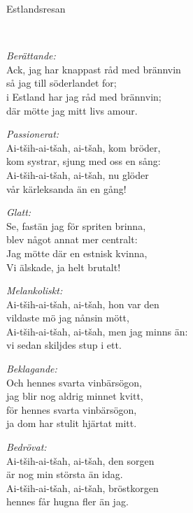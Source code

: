 \begin{song}{Estlandsresan}
	
	\\
	
	
	\; \emph{ Berättande:}\\
	Ack, jag har knappast råd med brännvin\\
	så jag till söderlandet for;\\
	i Estland har jag råd med brännvin;\\
	där mötte jag mitt livs amour.
	
	\vspace{-.1cm}
	\; \emph{ Passionerat:}	\\
	Ai-tših-ai-tšah, ai-tšah, kom bröder,\\
	kom systrar, sjung med oss en sång:\\
	Ai-tših-ai-tšah, ai-tšah, nu glöder\\
	vår kärleksanda än en gång!
	
	\vspace{.1cm}
	\; \emph{ Glatt:}\\
	Se, fastän jag för spriten brinna,\\
	blev något annat mer centralt:\\
	Jag mötte där en estnisk kvinna,\\
	Vi älskade, ja helt brutalt!

	\vspace{-.1cm}
	\; \emph{ Melankoliskt:}\\
	Ai-tših-ai-tšah, ai-tšah, hon var den\\
	vildaste mö jag nånsin mött,\\
	Ai-tših-ai-tšah, ai-tšah, men jag minns än:\\
	vi sedan skiljdes stup i ett.

	\vspace{.1cm}
	\; \emph{ Beklagande:}\\
	Och hennes svarta vinbärsögon,\\
	jag blir nog aldrig minnet kvitt,\\
	för hennes svarta vinbärsögon,\\
	ja dom har stulit hjärtat mitt.
	
	\vspace{-.1cm}
	\; \emph{ Bedrövat:}\\
	Ai-tših-ai-tšah, ai-tšah, den sorgen\\
	är nog min största än idag.\\
	Ai-tših-ai-tšah, ai-tšah, bröstkorgen\\
	hennes får hugna fler än jag.


\end{song}
